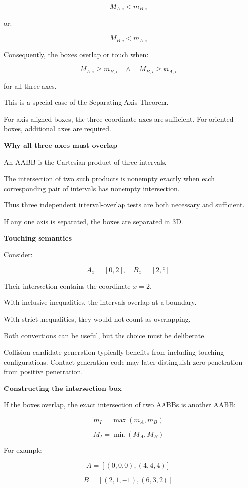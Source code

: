 \[
M_{A,i}<m_{B,i}
\]

or:

\[
M_{B,i}<m_{A,i}
\]

Consequently, the boxes overlap or touch when:

\[
\boxed{ M_{A,i}\ge m_{B,i} \quad\land\quad M_{B,i}\ge m_{A,i} }
\]

for all three axes.

This is a special case of the Separating Axis Theorem.

For axis-aligned boxes, the three coordinate axes are sufficient. For oriented boxes, additional axes are required.

\textbf{Why all three axes must overlap}

An AABB is the Cartesian product of three intervals.

The intersection of two such products is nonempty exactly when each corresponding pair of intervals has nonempty intersection.

Thus three independent interval-overlap tests are both necessary and sufficient.

If any one axis is separated, the boxes are separated in 3D.

\textbf{Touching semantics}

Consider:

\[
A_x=[0,2],\quad B_x=[2,5]
\]

Their intersection contains the coordinate \(x=2\).

With inclusive inequalities, the intervals overlap at a boundary.

With strict inequalities, they would not count as overlapping.

Both conventions can be useful, but the choice must be deliberate.

Collision candidate generation typically benefits from including touching configurations. Contact-generation code may later distinguish zero penetration from positive penetration.

\textbf{Constructing the intersection box}

If the boxes overlap, the exact intersection of two AABBs is another AABB:

\[
\boxed{ m_I=\max(m_A,m_B) }
\]

\[
\boxed{ M_I=\min(M_A,M_B) }
\]

For example:

\[
A=[(0,0,0),(4,4,4)]
\]

\[
B=[(2,1,-1),(6,3,2)]
\]

